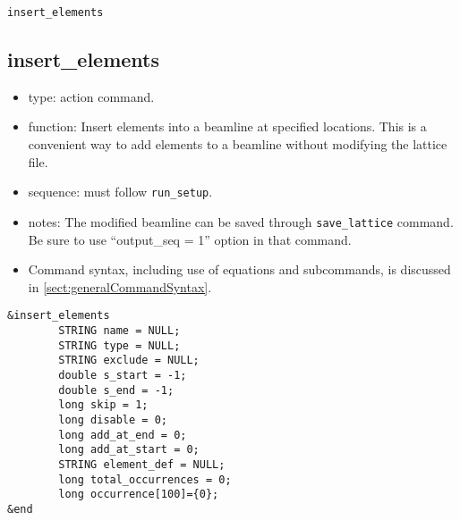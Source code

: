 \documentclass[11pt]{article}
\begin{document}
\newpage
\begin{center}{\Large\verb|insert_elements|}\end{center}
\subsection{insert\_elements \label{subsec:insertelements}}

\begin{itemize}
\item type: action command.
\item function: Insert elements into a beamline at specified locations. This is a convenient way to
 add elements to a beamline without modifying the lattice file.
\item sequence: must follow \verb|run_setup|.
\item notes: 
	The modified beamline can be saved through \verb|save_lattice|
   command. Be sure to use ``output\_seq = 1'' option in that command.  
\item Command syntax, including use of equations and subcommands, is discussed in \ref{sect:generalCommandSyntax}.
\end{itemize}

\begin{verbatim}
&insert_elements
        STRING name = NULL;
        STRING type = NULL;
        STRING exclude = NULL;
        double s_start = -1;
        double s_end = -1;
        long skip = 1;
        long disable = 0;
        long add_at_end = 0;
        long add_at_start = 0;
        STRING element_def = NULL;
        long total_occurrences = 0;
        long occurrence[100]={0};
&end
\end{verbatim}
\end{document}

